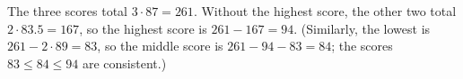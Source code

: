 The three scores total $3\cdot87=261$. Without the highest score, the other two total $2\cdot83.5=167$, so the highest score is $261-167=\boxed{94}$. (Similarly, the lowest is $261-2\cdot89=83$, so the middle score is $261-94-83=84$; the scores $83\le84\le94$ are consistent.)
